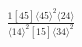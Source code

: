 \documentclass[varwidth, border=5pt]{standalone}
\begin{document}
\begin{my}
$\begin{gathered}
\scriptscriptstyle\frac{1[45]⟨45⟩^2⟨24⟩}{⟨14⟩^2[15]⟨34⟩^2}
\end{gathered}$
\end{my}
\end{document}
